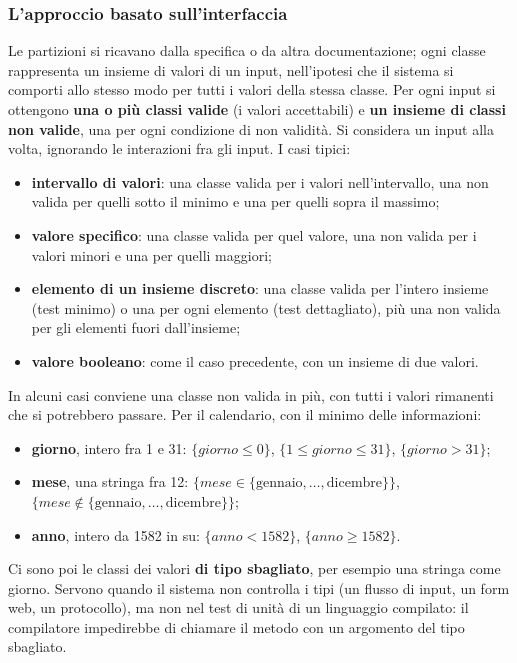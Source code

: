 \subsubsection*{L'approccio basato sull'interfaccia}

Le partizioni si ricavano dalla specifica o da altra documentazione; ogni classe rappresenta un insieme di valori di un
input, nell'ipotesi che il sistema si comporti allo stesso modo per tutti i valori della stessa classe. Per ogni input
si ottengono \textbf{una o più classi valide} (i valori accettabili) e \textbf{un insieme di classi non valide}, una per
ogni condizione di non validità. Si considera un input alla volta, ignorando le interazioni fra gli input. I casi tipici:

\begin{itemize}
  \item \textbf{intervallo di valori}: una classe valida per i valori nell'intervallo, una non valida per quelli sotto
        il minimo e una per quelli sopra il massimo;
  \item \textbf{valore specifico}: una classe valida per quel valore, una non valida per i valori minori e una per
        quelli maggiori;
  \item \textbf{elemento di un insieme discreto}: una classe valida per l'intero insieme (test minimo) o una per ogni
        elemento (test dettagliato), più una non valida per gli elementi fuori dall'insieme;
  \item \textbf{valore booleano}: come il caso precedente, con un insieme di due valori.
\end{itemize}

In alcuni casi conviene una classe non valida in più, con tutti i valori rimanenti che si potrebbero passare. Per il
calendario, con il minimo delle informazioni:

\begin{itemize}
  \item \textbf{giorno}, intero fra 1 e 31: \(\{giorno \le 0\}\), \(\{1 \le giorno \le 31\}\), \(\{giorno > 31\}\);
  \item \textbf{mese}, una stringa fra 12: \(\{mese \in \{\text{gennaio}, \ldots, \text{dicembre}\}\}\),
        \(\{mese \notin \{\text{gennaio}, \ldots, \text{dicembre}\}\}\);
  \item \textbf{anno}, intero da 1582 in su: \(\{anno < 1582\}\), \(\{anno \ge 1582\}\).
\end{itemize}

Ci sono poi le classi dei valori \textbf{di tipo sbagliato}, per esempio una stringa come giorno. Servono quando il
sistema non controlla i tipi (un flusso di input, un form web, un protocollo), ma non nel test di unità di un linguaggio
compilato: il compilatore impedirebbe di chiamare il metodo con un argomento del tipo sbagliato.

